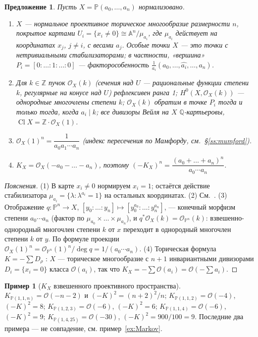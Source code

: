 \documentclass[11pt,a4paper]{article}
\theoremstyle{plain}
\newtheorem{proposition}[theorem]{Предложение}
\theoremstyle{definition}
\newtheorem{example}[theorem]{Пример}
\theoremstyle{remark}
\newcommand{\Z}{\mathbb{Z}}
\newcommand{\Q}{\mathbb{Q}}
\newcommand{\PP}{\mathbb{P}}
\newcommand{\A}{\mathbb{A}}
\newcommand{\cO}{\mathcal{O}}
\DeclareMathOperator{\Cl}{Cl}
\begin{document}
\begin{proposition}\label{prop:wps}
Пусть $X=\PP(a_0,\dots,a_n)$ нормализовано.
\begin{enumerate}
\item $X$ --- нормальное проективное торическое многообразие размерности $n$, покрытое картами
$U_i=\{x_i\ne0\}\cong\A^n/\mu_{a_i}$, где $\mu_{a_i}$ действует на координатах $x_j$, $j\ne i$,
с весами $a_j$. Особые точки $X$ --- это точки с нетривиальными стабилизаторами; в частности,
«вершина» $P_i=[0:\dots:1:\dots:0]$ --- факторособенность $\frac1{a_i}(a_0,\dots,\widehat{a_i},\dots,a_n)$.
\item Для $k\in\Z$ пучок $\cO_X(k)$ (сечения над $U$ --- рациональные функции степени $k$,
регулярные на конусе над $U$) рефлексивен ранга 1; $H^0(X,\cO_X(k))$ --- однородные многочлены
степени $k$; $\cO_X(k)$ обратим в точке $P_i$ тогда и только тогда, когда $a_i\mid k$; все
дивизоры Вейля на $X$ $\Q$-картьеровы, $\Cl X=\Z\cdot\cO_X(1)$.
\item $\cO_X(1)^n=\dfrac1{a_0a_1\cdots a_n}$ (индекс пересечения по Мамфорду, см.~\S\ref{ss:mumford}).
\item $K_X=\cO_X(-a_0-\dots-a_n)$, поэтому $(-K_X)^n=\dfrac{(a_0+\dots+a_n)^n}{a_0\cdots a_n}$.
\end{enumerate}
\end{proposition}
\begin{proof}[Пояснения]
(1) В карте $x_i\ne0$ нормируем $x_i=1$; остаётся действие стабилизатора $\mu_{a_i}=\{\lambda:
\lambda^{a_i}=1\}$ на остальных координатах. (2) См.~\cite[\S\,1]{Dolg-WPS}. (3) Отображение
$q\colon\PP^n\to X$, $[y_0:\dots:y_n]\mapsto[y_0^{a_0}:\dots:y_n^{a_n}]$, --- конечный морфизм
степени $a_0\cdots a_n$ (фактор по $\mu_{a_0}\times\dots\times\mu_{a_n}$), и $q^*\cO_X(k)=\cO_{\PP^n}(k)$:
взвешенно-однородный многочлен степени $k$ от $x$ переходит в однородный многочлен степени $k$ от
$y$. По формуле проекции $\cO_X(1)^n=\cO_{\PP^n}(1)^n/\deg q=1/(a_0\cdots a_n)$. (4) Торическая
формула $K=-\sum D_\rho$ \cite[4.20]{AG}: $X$ --- торическое многообразие с $n+1$ инвариантными
дивизорами $D_i=\{x_i=0\}$ класса $\cO(a_i)$, так что $K_X=-\sum\cO(a_i)=\cO(-\sum a_i)$.
\end{proof}

\begin{example}[$K_X$ взвешенного проективного пространства]\label{ex:K-wps}
$K_{\PP(1,1,n)}=\cO(-n-2)$ и $(-K)^2=(n+2)^2/n$; $K_{\PP(1,1,2)}=\cO(-4)$, $(-K)^2=8$;
$K_{\PP(1,2,3)}=\cO(-6)$, $(-K)^2=6$; $K_{\PP(1,1,4)}=\cO(-6)$, $(-K)^2=9$;
$K_{\PP(1,4,25)}=\cO(-30)$, $(-K)^2=900/100=9$. Последние два примера --- не совпадение, см.
пример~\ref{ex:Markov}.
\end{example}
\end{document}
